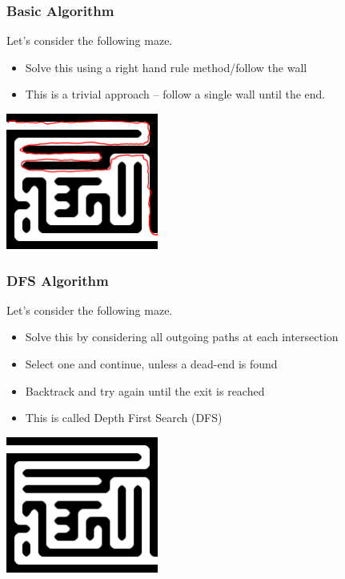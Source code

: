 \documentclass{beamer}
\begin{document}
\begin{frame}
    \frametitle{Basic Algorithm}
    Let's consider the following maze.
    \begin{itemize}
        \item Solve this using a right hand rule method/follow the wall
        \item This is a trivial approach -- follow a single wall until the end.
        
    \end{itemize}

    \includegraphics[width=5cm]{figures/maze_bfs_lg_rhr.png}

    
    \end{frame}

    \begin{frame}
        \frametitle{DFS Algorithm}
        Let's consider the following maze.
        \begin{itemize}
            \item Solve this by considering all outgoing paths at each intersection
            \item Select one and continue, unless a dead-end is found
            \item Backtrack and try again until the exit is reached
            \item This is called Depth First Search (DFS)
            
        \end{itemize}
    
        \includegraphics[width=5cm]{figures/maze_bfs_lg.png}
    
        
        \end{frame}
\end{document}
